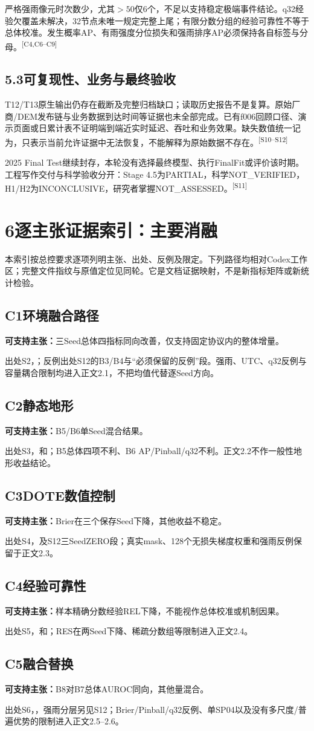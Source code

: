 \documentclass[UTF8,10.5pt,a4paper,fontset=none]{ctexart}
\newcommand{\evi}[1]{\textsuperscript{\textcolor{muted}{[#1]}}}
\newcommand{\nextpart}[1]{\clearpage\section*{#1}}
\newcommand{\claim}[2]{\subsection*{#1}\noindent\textbf{可支持主张：}#2\par}
\begin{document}
严格强雨像元时次数少，尤其$>50$仅6个，不足以支持稳定极端事件结论。q32经验欠覆盖未解决，32节点未唯一规定完整上尾；有限分数分组的经验可靠性不等于总体校准。发生概率AP、有雨强度分位损失和强雨排序AP必须保持各自标签与分母。\evi{C4,C6--C9}

\subsection*{5.3\quad 可复现性、业务与最终验收}
T12/T13原生输出仍存在截断及完整归档缺口；读取历史报告不是复算。原始厂商/DEM发布链与业务数据到达时间等证据也未全部完成。已有f006回顾口径、演示页面或日累计表不证明端到端近实时延迟、吞吐和业务效果。缺失数值统一记为，只表示当前允许证据中无法恢复，不能解释为原始数据不存在。\evi{S10--S12}

2025 Final Test继续封存，本轮没有选择最终模型、执行FinalFit或评价该时期。工程写作交付与科学验收分开：Stage 4.5为PARTIAL，科学NOT\_VERIFIED，H1/H2为INCONCLUSIVE，研究者掌握NOT\_ASSESSED。\evi{S11}

\nextpart{6\quad 逐主张证据索引：主要消融}
\noindent 本索引按总控要求逐项列明主张、出处、反例及限定。下列路径均相对Codex工作区；完整文件指纹与原值定位见同轮。它是文档证据映射，不是新指标矩阵或新统计检验。
\claim{C1\quad 环境融合路径}{三Seed总体四指标同向改善，仅支持固定协议内的整体增量。}
\noindent 出处S2，；反例出处S12的B3/B4与“必须保留的反例”段。强雨、UTC、q32反例与容量耦合限制均进入正文2.1，不把均值代替逐Seed方向。
\claim{C2\quad 静态地形}{B5/B6单Seed混合结果。}
\noindent 出处S3，和；B5总体四项不利、B6 AP/Pinball/q32不利。正文2.2不作一般性地形收益结论。
\claim{C3\quad DOTE数值控制}{Brier在三个保存Seed下降，其他收益不稳定。}
\noindent 出处S4，及S12三SeedZERO段；真实mask、128个无损失梯度权重和强雨反例保留于正文2.3。
\claim{C4\quad 经验可靠性}{样本精确分数经验REL下降，不能视作总体校准或机制因果。}
\noindent 出处S5，和；RES在两Seed下降、稀疏分数组等限制进入正文2.4。
\claim{C5\quad 融合替换}{B8对B7总体AUROC同向，其他量混合。}
\noindent 出处S6，，强雨分层另见S12；Brier/Pinball/q32反例、单SP04以及没有多尺度/普遍优势的限制进入正文2.5--2.6。
\end{document}
